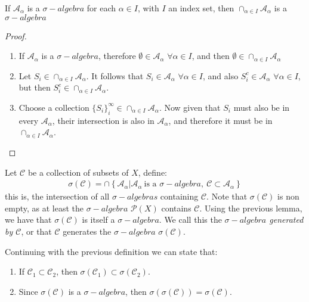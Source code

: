 \documentclass[aspectratio=169,handout]{beamer}
\begin{document}
\begin{frame}
    \begin{lemma}
        If $\mathcal{A}_\alpha$ is a $\sigma-algebra$ for each $\alpha\in I$, with $I$ an index set, then $\cap_{\alpha\in I}\mathcal{A}_\alpha$ is a $\sigma-algebra$
    \end{lemma}
    
    \pause

    \begin{proof}
        \begin{enumerate}
            \item If $\mathcal{A}_\alpha$ is a $\sigma-algebra$, therefore $\emptyset\in\mathcal{A}_\alpha$ $\forall \alpha\in I$, and then $\emptyset \in \cap_{\alpha\in I}\mathcal{A}_\alpha$
            \item Let $S_i\in \cap_{\alpha\in I}\mathcal{A}_\alpha$. It follows that $S_i\in\mathcal{A}_\alpha$ $\forall \alpha\in I$, and also $S_i^c\in \mathcal{A}_\alpha$ $\forall \alpha\in I$, but then $S_i^c\in \cap_{\alpha\in I}\mathcal{A}_\alpha$.
            \item Choose a collection $\{S_i\}_i^\infty\in \cap_{\alpha\in I}\mathcal{A}_\alpha$. Now given that $S_i$ must also be in every $\mathcal{A}_\alpha$, their intersection is also in $\mathcal{A}_\alpha$, and therefore it must be in $\cap_{\alpha\in I}\mathcal{A}_\alpha$.
        \end{enumerate}
    \end{proof}
\end{frame}

\begin{frame}
    Let $\mathcal{C}$ be a collection of subsets of $X$, define: 
    \begin{align*}
        \sigma(\mathcal{C})=\cap\left\{\mathcal{A}_\alpha | \mathcal{A}_\alpha\ \text{is a }\sigma-algebra,\ \mathcal{C}\subset\mathcal{A}_\alpha\right\}
    \end{align*}
    this is, the intersection of all $\sigma-algebras$ containing $\mathcal{C}$. Note that $\sigma(\mathcal{C})$ is non empty, as at least the $\sigma-algebra$ $\mathcal{P}(X)$ contains $\mathcal{C}$. Using the previous lemma, we have that $\sigma(\mathcal{C})$ is itself a $\sigma-algebra$. We call this the \textit{$\sigma-algebra$ generated by $\mathcal{C}$}, or that $\mathcal{C}$ generates the $\sigma-algebra$ $\sigma(\mathcal{C})$.
\end{frame}

\begin{frame}
    \begin{fact}
        Continuing with the previous definition we can state that:
        \begin{enumerate}
            \item If $\mathcal{C}_1\subset \mathcal{C}_2$, then $\sigma(\mathcal{C}_1)\subset\sigma(\mathcal{C}_2)$.
            \item Since $\sigma(\mathcal{C})$ is a $\sigma-algebra$, then $\sigma\left(\sigma(\mathcal{C})\right)=\sigma(\mathcal{C})$.
        \end{enumerate}
    \end{fact}
\end{frame}
\end{document}
